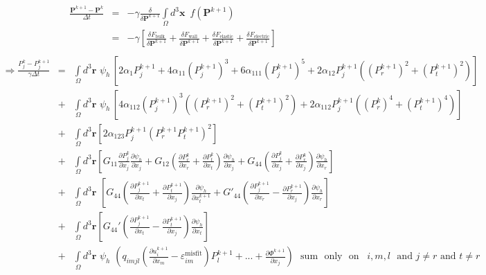 \documentclass[16pt]{article} %
\begin{document}
\vspace{-10pt}
\begin{eqnarray}\nonumber
 \frac{\textbf{P}^{k+1} - \textbf{P}^k}{\Delta t} &=& -\gamma \frac{\delta}{\delta \textbf{P}^{k+1}}\int\limits_\Omega d^3 {\boldsymbol x} \,\,\,f\left(\textbf{P}^{k+1} \right)\\ \nonumber
&=& -\gamma \left[\frac{\delta F_\mathrm{bulk}}{\delta \textbf{P}^{k+1}}+ \frac{\delta F_\mathrm{wall}}{\delta \textbf{P}^{k+1}}+ \frac{\delta F_\mathrm{elastic}}{\delta \textbf{P}^{k+1}} + \frac{\delta F_\mathrm{electric}}{\delta \textbf{P}^{k+1}} \right]\\ \nonumber
\end{eqnarray}
\vspace{-50pt}
\begin{eqnarray}\nonumber
\Rightarrow \frac{P_j^k - P_j^{k+1}}{\gamma \Delta t}  &=& \int\limits_\Omega d^3 \textbf{r} \,\, \psi_h\,\left[2 \alpha_1 P_j^{k+1} + 4 \alpha_{11} (P_j^{k+1})^3 + 6 \alpha_{111} (P_j^{k+1})^5 + 2 \alpha_{12} P_j^{k+1} \left((P_r^{k+1})^2 + (P_t^{k+1})^2 \right) \right]\\ \nonumber
&+& \int\limits_\Omega  d^3 \textbf{r}\,\,\psi_h\, \left[4 \alpha_{112} (P_j^{k+1})^3 \left(\left(P_r^{k+1}\right)^2 +( P_t^{k+1})^2 \right)  +  2 \alpha_{112} P_j^{k+1} \left((P_r^k)^4 + (P_t^{k+1})^4 \right) \right] \\ \nonumber
&+& \int\limits_\Omega d^3 \textbf{r} \left[2 \alpha_{123} P_j^{k+1} \left(P_r^{k+1} P_t^{k+1}\right)^2  \right] \\ \nonumber
&+& \int\limits_\Omega d^3 \textbf{r} \left[G_{11} \frac{\partial P^k_j}{\partial x_j} \frac{\partial \psi_h}{\partial x_j} + G_{12} \left(\frac{\partial P^k_r}{\partial x_r} + \frac{\partial P^k_t}{\partial x_t} \right) \frac{\partial \psi_h}{\partial x_j} + G_{44} \left(\frac{\partial P^k_j}{\partial x_j} + \frac{\partial P^k_r}{\partial x_j} \right)\frac{\partial \psi_h}{\partial x_r} \right]\\ \nonumber
&+& \int\limits_\Omega d^3 \textbf{r} \,\,\left[ G_{44} \left(\frac{\partial P^{k+1}_j}{\partial x_t} + \frac{\partial P^{k+1}_t}{\partial x_j} \right) \frac{\partial \psi_h}{\partial x^{k+1}_t} + G'_{44} \left(\frac{\partial P^{k+1}_j}{\partial x_r}  - \frac{\partial P^{k+1}_r}{\partial x_j}\right) \frac{\partial \psi_h}{\partial x_r} \right] \\ \nonumber
&+& \int\limits_\Omega d^3 \textbf{r}\left[G_{44}' \left(\frac{\partial P^{k+1}_j}{\partial x_t} - \frac{\partial P^{k+1}_t}{\partial x_j} \right) \frac{\partial \psi_h}{\partial x_t}\right]\\ \nonumber
&+&  \int\limits_\Omega d^3 \textbf{r}\,\, \psi_h \,\, \left(q_{imjl}\left( \frac{\partial u^{k+1}_i}{\partial x_m} - \varepsilon_{im}^\mathrm{misfit} \right) P^{k+1}_l  + ... + \frac{\partial \Phi^{k+1}}{\partial x_j}  \right)  \,\,\,\,\mathrm{sum}\,\,\,\,\mathrm{only}\,\,\,\,\mathrm{on}\,\,\,\,\, i,m,l \,\,\,\,\mathrm{and}\,\, j \neq r \,\,\mathrm{and}\,\, t \neq r\\ \nonumber %
\end{eqnarray}
\end{document}
